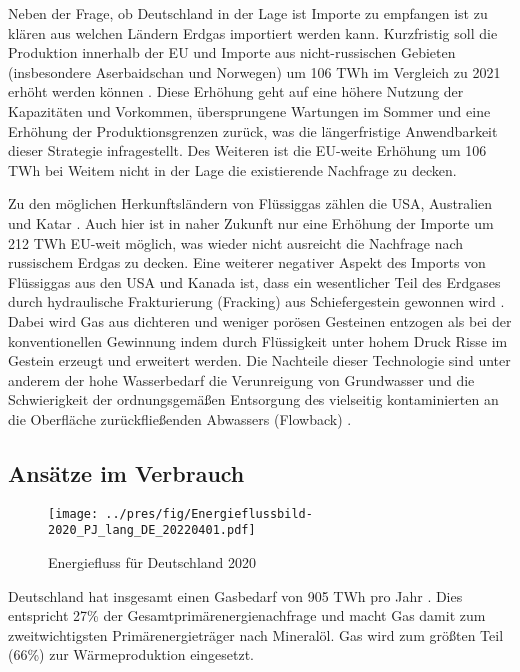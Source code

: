 Neben der Frage, ob Deutschland in der Lage ist Importe zu empfangen ist zu klären aus welchen Ländern Erdgas importiert werden kann. Kurzfristig soll die Produktion innerhalb der EU und Importe aus nicht-russischen Gebieten (insbesondere Aserbaidschan und Norwegen) um 106 TWh im Vergleich zu 2021 erhöht werden können \cite{iea2022}. Diese Erhöhung geht auf eine höhere Nutzung der Kapazitäten und Vorkommen, übersprungene Wartungen im Sommer und eine Erhöhung der Produktionsgrenzen zurück, was die längerfristige Anwendbarkeit dieser Strategie infragestellt. Des Weiteren ist die EU-weite Erhöhung um 106 TWh bei Weitem nicht in der Lage die existierende Nachfrage zu decken.

Zu den möglichen Herkunftsländern von Flüssiggas zählen die USA, Australien und Katar \cite{iea2022}. Auch hier ist in naher Zukunft nur eine Erhöhung der Importe um 212 TWh EU-weit möglich, was wieder nicht ausreicht die Nachfrage nach russischem Erdgas zu decken. 
Eine weiterer negativer Aspekt des Imports von Flüssiggas aus den USA und Kanada ist, dass ein wesentlicher Teil des Erdgases durch hydraulische Frakturierung (Fracking) aus Schiefergestein gewonnen wird \cite{statista-schiefergasproduktion, statista-nicht-konventionelle-gase}. Dabei wird Gas aus dichteren und weniger porösen Gesteinen entzogen als bei der konventionellen Gewinnung indem durch Flüssigkeit unter hohem Druck Risse im Gestein erzeugt und erweitert werden. Die Nachteile dieser Technologie sind unter anderem der hohe Wasserbedarf die Verunreigung von Grundwasser und die Schwierigkeit der ordnungsgemäßen Entsorgung des vielseitig kontaminierten an die Oberfläche zurückfließenden Abwassers (Flowback) \cite{uba-fracking}. 

\subsection{Ansätze im Verbrauch}

\begin{figure}
\centering
\texttt{[image: ../pres/fig/Energieflussbild-2020\_PJ\_lang\_DE\_20220401.pdf]}
\caption{Energiefluss für Deutschland 2020 \cite{energieflussbild}}
\label{fig:energiefluss}
\end{figure}

Deutschland hat insgesamt einen Gasbedarf von 905 TWh pro Jahr \cite{clausen2022}. Dies entspricht 27\% der Gesamtprimärenergienachfrage und macht Gas damit zum zweitwichtigsten Primärenergieträger nach Mineralöl. Gas wird zum größten Teil (66\%) zur Wärmeproduktion eingesetzt. 

